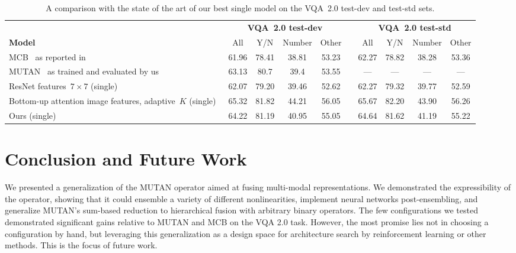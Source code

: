 \begin{table*}[!t]
\centering
\caption{A comparison with the state of the art of our best single model on the
         VQA~2.0 test-dev and test-std sets.}
\begin{tabular}{l*{9}{c}}
& \multicolumn{4}{c}{\textbf{VQA~2.0 test-dev}} & & \multicolumn{4}{c}{\textbf{VQA~2.0 test-std}} \\
\textbf{Model} & All & Y/N & Number & Other & & All & Y/N & Number & Other \\
\midrule
MCB~\cite{DBLP:conf/emnlp/FukuiPYRDR16} as reported in~\cite{goyal2017making} & 61.96 & 78.41 & 38.81 & 53.23 & & 62.27 & 78.82 & 38.28 & 53.36 \\
MUTAN~\cite{ben2017mutan} as trained and evaluated by us & 63.13 & 80.7 & 39.4 & 53.55 & & --- & --- & --- & --- \\
ResNet features~$7 \times 7$ (single)~\cite{teney2017tips} & 62.07 & 79.20 & 39.46 & 52.62 & & 62.27 & 79.32 & 39.77 & 52.59 \\
Bottom-up attention image features, adaptive~$K$ (single)~\cite{teney2017tips} & 65.32 & 81.82 & 44.21 & 56.05 & & 65.67 & 82.20 & 43.90 & 56.26 \\
\midrule
Ours (single) & 64.22 & 81.19 & 40.95 & 55.05 & & 64.64 & 81.62 & 41.19 & 55.22 \\
\midrule
\end{tabular}
\label{tab:sota-comparison}
\end{table*}


\section{Conclusion and Future Work}

We presented a generalization of the MUTAN operator aimed at fusing multi-modal
representations. We demonstrated the expressibility of the operator, showing
that it could ensemble a variety of different nonlinearities, implement neural
networks post-ensembling, and generalize MUTAN's sum-based reduction to
hierarchical fusion with arbitrary binary operators. The few configurations we
tested demonstrated significant gains relative to MUTAN and MCB on the VQA 2.0
task. However, the most promise lies not in choosing a configuration by hand,
but leveraging this generalization as a design space for architecture search by
reinforcement learning or other methods. This is the focus of future work.

\FloatBarrier{}
